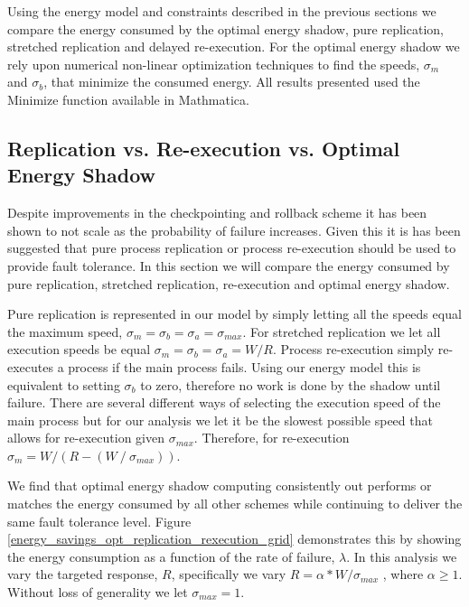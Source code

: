 Using the energy model and constraints described in the previous
 sections we compare the energy consumed by the optimal energy shadow,
 pure replication, stretched replication and delayed re-execution. For
 the optimal energy shadow we rely upon numerical non-linear
 optimization techniques to find the speeds, $\sigma_m$ and
 $\sigma_b$, that minimize the consumed energy. All results presented
 used the Minimize function available in Mathmatica.

\subsection{Replication vs. Re-execution vs. Optimal Energy Shadow}

Despite improvements in the checkpointing and rollback scheme it has
been shown to not scale as the probability of failure increases. Given
this it is has been suggested that pure process replication or process
re-execution should be used to provide fault tolerance. In this
section we will compare the energy consumed by pure replication,
stretched replication, re-execution and optimal energy shadow.

Pure replication is represented in our model by simply letting all the
speeds equal the maximum speed, $\sigma_m = \sigma_b= \sigma_a
= \sigma_{max}$. For stretched replication we let all execution speeds
be equal $\sigma_m=\sigma_b=\sigma_a=W/R$. Process re-execution simply
re-executes a process if the main process fails. Using our energy
model this is equivalent to setting $\sigma_b$ to zero, therefore no
work is done by the shadow until failure. There are several different
ways of selecting the execution speed of the main process but for our
analysis we let it be the slowest possible speed that allows for
re-execution given $\sigma_{max}$. Therefore, for re-execution
$\sigma_m=W/(R-(W⁄\sigma_{max} ))$.

We find that optimal energy shadow computing consistently out performs
or matches the energy consumed by all other schemes while continuing
to deliver the same fault tolerance
level. Figure \ref{energy_savings_opt_replication_rexecution_grid}
demonstrates this by showing the energy consumption as a function of
the rate of failure, $\lambda$. In this analysis we vary the targeted
response, $R$, specifically we vary $R=\alpha*W/\sigma_{max}$ , where
$\alpha≥1$. Without loss of generality we let $\sigma_{max}=1$.

